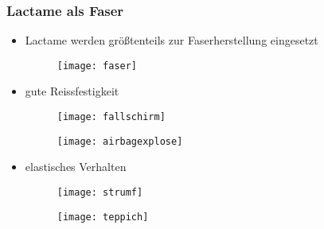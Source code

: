 \documentclass[10pt]{beamer}
\begin{document}
\begin{frame}[t]
  \frametitle{\small Lactame als Faser}
  \begin{itemize}
   \item \scriptsize Lactame werden größtenteils zur Faserherstellung eingesetzt
   \begin{figure}
 \centering
\begin{minipage}{.5\textwidth}
  \centering
  \texttt{[image: faser]}

\end{minipage}%
\begin{minipage}{.5\textwidth}
\end{minipage}

      \end{figure}
   \item \scriptsize gute Reissfestigkeit
   \begin{figure}
    \centering
\begin{minipage}{.5\textwidth}
  \centering
  \texttt{[image: fallschirm]}
\end{minipage}%
\begin{minipage}{.5\textwidth}
  \centering
  \texttt{[image: airbagexplose]}
\end{minipage}
      \end{figure}
   \item \scriptsize elastisches Verhalten
   \begin{figure}
            \centering
\begin{minipage}{.5\textwidth}
  \centering
  \texttt{[image: strumf]}
\end{minipage}%
\begin{minipage}{.5\textwidth}
  \centering
  \texttt{[image: teppich]}
\end{minipage}
      \end{figure}
  \end{itemize}
\end{frame}
\end{document}
